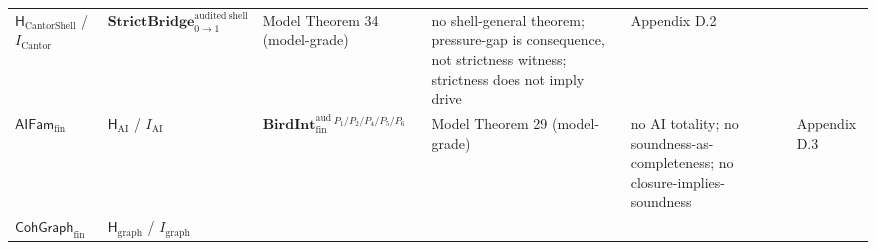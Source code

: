 \documentclass[11pt]{article}
\theoremstyle{definition}
\begin{document}
\begin{longtable}[]{@{}llllll@{}}
\begin{minipage}[t]{0.12\columnwidth}
\(\mathsf H_{\mathrm{CantorShell}}\) / \(I_{\mathrm{Cantor}}\)\strut
\end{minipage} & \begin{minipage}[t]{0.22\columnwidth}\raggedright
\(\mathbf{StrictBridge}_{0\to 1}^{\mathrm{audited\ shell}}\)\strut
\end{minipage} & \begin{minipage}[t]{0.12\columnwidth}\raggedright
Model Theorem 34 (model-grade)\strut
\end{minipage} & \begin{minipage}[t]{0.22\columnwidth}\raggedright
no shell-general theorem; pressure-gap is consequence, not strictness witness; strictness does not imply drive\strut
\end{minipage} & \begin{minipage}[t]{0.08\columnwidth}\raggedright
Appendix D.2\strut
\end{minipage}\tabularnewline
\begin{minipage}[t]{0.08\columnwidth}\raggedright
\(\mathsf{AIFam}_{\mathrm{fin}}\)\strut
\end{minipage} & \begin{minipage}[t]{0.12\columnwidth}\raggedright
\(\mathsf H_{\mathrm{AI}}\) / \(I_{\mathrm{AI}}\)\strut
\end{minipage} & \begin{minipage}[t]{0.22\columnwidth}\raggedright
\(\mathbf{BirdInt}^{\mathrm{aud}}_{\mathrm{fin}}{}^{\,P_{1}/P_{2}/P_{4}/P_{5}/P_{6}}\)\strut
\end{minipage} & \begin{minipage}[t]{0.12\columnwidth}\raggedright
Model Theorem 29 (model-grade)\strut
\end{minipage} & \begin{minipage}[t]{0.22\columnwidth}\raggedright
no AI totality; no soundness-as-completeness; no closure-implies-soundness\strut
\end{minipage} & \begin{minipage}[t]{0.08\columnwidth}\raggedright
Appendix D.3\strut
\end{minipage}\tabularnewline
\begin{minipage}[t]{0.08\columnwidth}\raggedright
\(\mathsf{CohGraph}_{\mathrm{fin}}\)\strut
\end{minipage} & \begin{minipage}[t]{0.12\columnwidth}\raggedright
\(\mathsf H_{\mathrm{graph}}\) / \(I_{\mathrm{graph}}\)\strut
\end{minipage} & \begin{minipage}[t]{0.22\columnwidth}\raggedright

\end{minipage}
\end{longtable}
\end{document}
